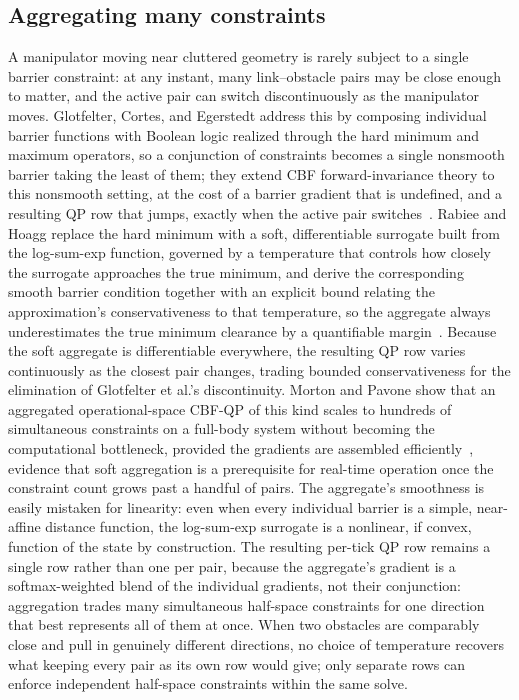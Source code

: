 \subsection{Aggregating many constraints}
\label{sec:sota-aggregation}

A manipulator moving near cluttered geometry is rarely subject to a single barrier constraint: at any instant, many link--obstacle pairs may be close enough to matter, and the active pair can switch discontinuously as the manipulator moves. Glotfelter, Cortes, and Egerstedt address this by composing individual barrier functions with Boolean logic realized through the hard minimum and maximum operators, so a conjunction of constraints becomes a single nonsmooth barrier taking the least of them; they extend CBF forward-invariance theory to this nonsmooth setting, at the cost of a barrier gradient that is undefined, and a resulting QP row that jumps, exactly when the active pair switches~\cite{glotfelter2017}. Rabiee and Hoagg replace the hard minimum with a soft, differentiable surrogate built from the log-sum-exp function, governed by a temperature that controls how closely the surrogate approaches the true minimum, and derive the corresponding smooth barrier condition together with an explicit bound relating the approximation's conservativeness to that temperature, so the aggregate always underestimates the true minimum clearance by a quantifiable margin~\cite{rabiee2025softmin}. Because the soft aggregate is differentiable everywhere, the resulting QP row varies continuously as the closest pair changes, trading bounded conservativeness for the elimination of Glotfelter et al.'s discontinuity. Morton and Pavone show that an aggregated operational-space CBF-QP of this kind scales to hundreds of simultaneous constraints on a full-body system without becoming the computational bottleneck, provided the gradients are assembled efficiently~\cite{morton2025oscbf}, evidence that soft aggregation is a prerequisite for real-time operation once the constraint count grows past a handful of pairs. The aggregate's smoothness is easily mistaken for linearity: even when every individual barrier is a simple, near-affine distance function, the log-sum-exp surrogate is a nonlinear, if convex, function of the state by construction. The resulting per-tick QP row remains a single row rather than one per pair, because the aggregate's gradient is a softmax-weighted blend of the individual gradients, not their conjunction: aggregation trades many simultaneous half-space constraints for one direction that best represents all of them at once. When two obstacles are comparably close and pull in genuinely different directions, no choice of temperature recovers what keeping every pair as its own row would give; only separate rows can enforce independent half-space constraints within the same solve.

